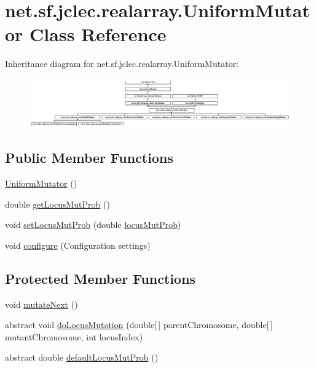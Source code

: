 \hypertarget{classnet_1_1sf_1_1jclec_1_1realarray_1_1_uniform_mutator}{\section{net.\-sf.\-jclec.\-realarray.\-Uniform\-Mutator Class Reference}
\label{classnet_1_1sf_1_1jclec_1_1realarray_1_1_uniform_mutator}
}
Inheritance diagram for net.\-sf.\-jclec.\-realarray.\-Uniform\-Mutator\-:\begin{figure}[H]
\begin{center}
\leavevmode
\includegraphics[height=2.128122cm]{classnet_1_1sf_1_1jclec_1_1realarray_1_1_uniform_mutator}
\end{center}
\end{figure}
\subsection*{Public Member Functions}
\begin{DoxyCompactItemize}
\item 
\hyperlink{classnet_1_1sf_1_1jclec_1_1realarray_1_1_uniform_mutator_a3578d7086fa0809e56ee76acee1ee4fd}{Uniform\-Mutator} ()
\item 
double \hyperlink{classnet_1_1sf_1_1jclec_1_1realarray_1_1_uniform_mutator_aa200893402d70d423d132057380cd34d}{get\-Locus\-Mut\-Prob} ()
\item 
void \hyperlink{classnet_1_1sf_1_1jclec_1_1realarray_1_1_uniform_mutator_a4c93bb0470fa386c72bca6e433f824cd}{set\-Locus\-Mut\-Prob} (double \hyperlink{classnet_1_1sf_1_1jclec_1_1realarray_1_1_uniform_mutator_ab5a0d929acb803f2aea077438a92a231}{locus\-Mut\-Prob})
\item 
void \hyperlink{classnet_1_1sf_1_1jclec_1_1realarray_1_1_uniform_mutator_a2943ed155a1dc633aee8e6b4a2811ac6}{configure} (Configuration settings)
\end{DoxyCompactItemize}
\subsection*{Protected Member Functions}
\begin{DoxyCompactItemize}
\item 
void \hyperlink{classnet_1_1sf_1_1jclec_1_1realarray_1_1_uniform_mutator_a7c90fd0f74afd20e102f9cbf87014e9b}{mutate\-Next} ()
\item 
abstract void \hyperlink{classnet_1_1sf_1_1jclec_1_1realarray_1_1_uniform_mutator_a7f218607a6f472d795048b31a2eb215c}{do\-Locus\-Mutation} (double\mbox{[}$\,$\mbox{]} parent\-Chromosome, double\mbox{[}$\,$\mbox{]} mutant\-Chromosome, int locus\-Index)
\item 
abstract double \hyperlink{classnet_1_1sf_1_1jclec_1_1realarray_1_1_uniform_mutator_a83eb6262ccd87a0998d66af04e95dedb}{default\-Locus\-Mut\-Prob} ()
\end{DoxyCompactItemize}
